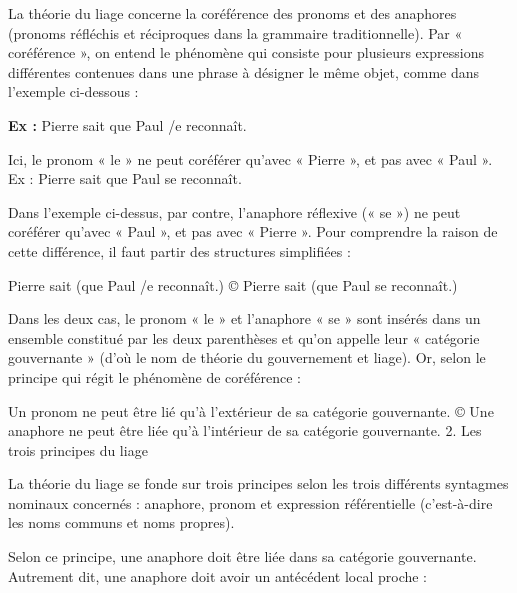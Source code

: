 La théorie du liage concerne la coréférence des pronoms et des anaphores (pronoms réfléchis et réciproques dans la grammaire traditionnelle). Par « coréférence », on entend le phénomène qui consiste pour plusieurs expressions différentes contenues dans une phrase à désigner le même objet, comme dans l’exemple ci-dessous :\par

\noindent\textbf{Ex :} Pierre sait que Paul /e reconnaît.\par

Ici, le pronom « le » ne peut coréférer qu’avec « Pierre », et pas avec « Paul ». Ex : Pierre sait que Paul se reconnaît.\par

Dans l’exemple ci-dessus, par contre, l’anaphore réflexive (« se ») ne peut coréférer qu’avec « Paul », et pas avec « Pierre ». Pour comprendre la raison de cette différence, il faut partir des structures simplifiées :\par

Pierre sait (que Paul /e reconnaît.) © Pierre sait (que Paul se reconnaît.)\par

Dans les deux cas, le pronom « le » et l’anaphore « se » sont insérés dans un ensemble constitué par les deux parenthèses et qu’on appelle leur « catégorie gouvernante » (d’où le nom de théorie du gouvernement et liage). Or, selon le principe qui régit le phénomène de coréférence :\par

Un pronom ne peut être lié qu’à l'extérieur de sa catégorie gouvernante. © Une anaphore ne peut être liée qu’à l’intérieur de sa catégorie gouvernante. 2. Les trois principes du liage\par

La théorie du liage se fonde sur trois principes selon les trois différents syntagmes nominaux concernés : anaphore, pronom et expression référentielle (c’est-à-dire les noms communs et noms propres).\par


Selon ce principe, une anaphore doit être liée dans sa catégorie gouvernante. Autrement dit, une anaphore doit avoir un antécédent local proche :\par

